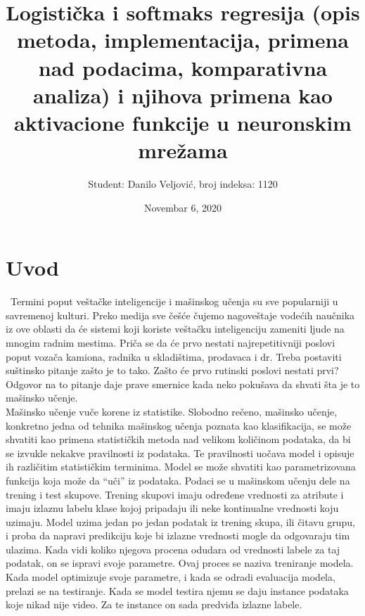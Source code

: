 \documentclass[a4paper,12pt]{report}
\begin{document}

\title{\Large{\textbf{Logistička i softmaks regresija (opis metoda, implementacija, primena nad podacima, komparativna analiza) i njihova primena kao aktivacione funkcije u neuronskim mrežama }}}
\author{Student: Danilo Veljović, broj indeksa: 1120}
\date{Novembar 6, 2020}
\maketitle
\let\cleardoublepage\clearpage
\tableofcontents


\setcounter{page}{1}

\chapter{Uvod}
\ Termini poput veštačke inteligencije i mašinskog učenja su sve popularniji u savremenoj kulturi. Preko medija sve češće čujemo nagoveštaje vodećih naučnika iz ove oblasti da će sistemi koji koriste veštačku inteligenciju zameniti ljude na mnogim radnim mestima. Priča se da će prvo nestati najrepetitivniji poslovi poput vozača kamiona, radnika u skladištima, prodavaca i dr. Treba postaviti suštinsko pitanje zašto je to tako. Zašto će prvo rutinski poslovi nestati prvi? Odgovor na to pitanje daje prave smernice kada neko pokušava da shvati šta je to mašinsko učenje. \\ 

Mašinsko učenje vuče korene iz statistike. Slobodno rečeno, mašinsko učenje, konkretno jedna od tehnika mašinskog učenja poznata kao klasifikacija, se može shvatiti kao primena statističkih metoda nad velikom količinom podataka, da bi se izvukle nekakve pravilnosti iz podataka. Te pravilnosti uočava model i opisuje ih različitim statističkim terminima. Model se može shvatiti kao parametrizovana funkcija koja može da \enquote{uči} iz podataka. Podaci se u mašinskom učenju dele na trening i test skupove. Trening skupovi imaju određene vrednosti za atribute i imaju izlaznu labelu klase kojoj pripadaju ili neke kontinualne vrednosti koju uzimaju. Model uzima jedan po jedan podatak iz trening skupa, ili čitavu grupu, i proba da napravi predikciju koje bi izlazne vrednosti mogle da odgovaraju tim ulazima. Kada vidi koliko njegova procena odudara od vrednosti labele za taj podatak, on se ispravi svoje parametre. Ovaj proces se naziva treniranje modela. Kada model optimizuje svoje parametre, i kada se odradi evaluacija modela, prelazi se na testiranje. Kada se model testira njemu se daju instance podataka koje nikad nije video. Za te instance on sada predviđa izlazne labele. \\
\end{document}
